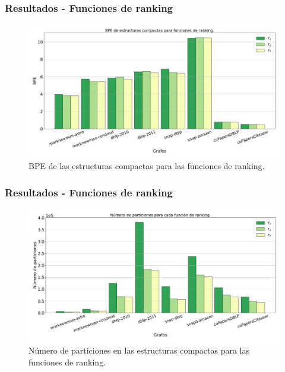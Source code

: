 \begin{frame}
\frametitle{Resultados - Funciones de ranking}

\begin{figure}
    	\centering
    	\includegraphics[width=1\linewidth]{../img/bpe3.pdf}
    	
    \caption{BPE de las estructuras compactas para las funciones de ranking.}
\end{figure}

\end{frame}


\begin{frame}
\frametitle{Resultados - Funciones de ranking}

\begin{figure}
    	\centering
    \includegraphics[width=1\linewidth]{../img/Npartitions3.pdf}
    	
    \caption{Número de particiones en las estructuras compactas para las funciones de ranking.}
\end{figure}

\end{frame}

